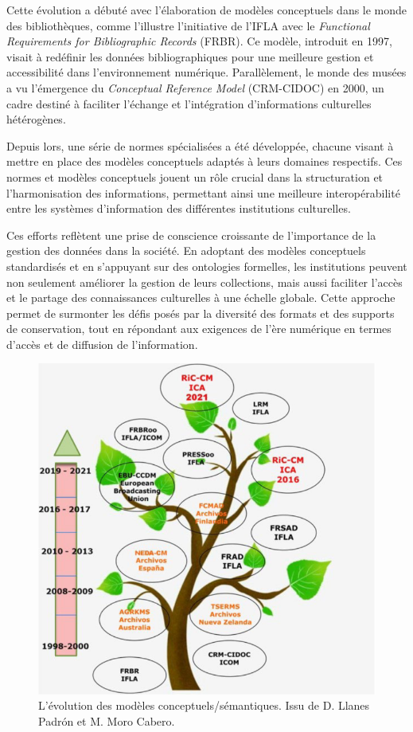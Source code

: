 \documentclass[12pt]{report}
\begin{document}
Cette évolution a débuté avec l'élaboration de modèles conceptuels dans le monde des bibliothèques, comme l'illustre l'initiative de l'IFLA avec le \textit{Functional Requirements for Bibliographic Records} (FRBR)\autocite{IFLA1997Functional}. Ce modèle, introduit en 1997, visait à redéfinir les données bibliographiques pour une meilleure gestion et accessibilité dans l'environnement numérique. Parallèlement, le monde des musées a vu l'émergence du \textit{Conceptual Reference Model} (CRM-CIDOC) en 2000, un cadre destiné à faciliter l'échange et l'intégration d'informations culturelles hétérogènes.

Depuis lors, une série de normes spécialisées a été développée, chacune visant à mettre en place des modèles conceptuels adaptés à leurs domaines respectifs\autocite{Koch2021Moving, LlanesPadron2023RiC-CM}. Ces normes et modèles conceptuels jouent un rôle crucial dans la structuration et l'harmonisation des informations, permettant ainsi une meilleure interopérabilité entre les systèmes d'information des différentes institutions culturelles.

Ces efforts reflètent une prise de conscience croissante de l'importance de la gestion des données dans la société. En adoptant des modèles conceptuels standardisés et en s'appuyant sur des ontologies formelles, les institutions peuvent non seulement améliorer la gestion de leurs collections, mais aussi faciliter l'accès et le partage des connaissances culturelles à une échelle globale. Cette approche permet de surmonter les défis posés par la diversité des formats et des supports de conservation, tout en répondant aux exigences de l'ère numérique en termes d'accès et de diffusion de l'information.
\newline
\begin{figure}[h]
    \centering
    \includegraphics[scale = 0.4]{evolution_CM.png}
    \caption {L'évolution des modèles conceptuels/sémantiques. Issu de D. Llanes Padrón et M. Moro Cabero.}
    \label{fig:enter-label}
\end{figure}
\newline
\end{document}
